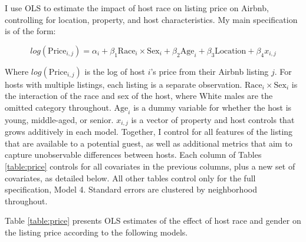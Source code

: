 
I use OLS to estimate the impact of host race on listing price on Airbnb, controlling for location, property, and host characteristics. My main specification is of the form:

\[ log(\text{Price}_{i,j}) = \alpha_i + \beta_1 \text{Race}_{i} \times \text{Sex}_i + \beta_2 \text{Age}_i + \beta_3 \text{Location} +  \beta_4 x_{i,j} \]

Where $log(\text{Price}_{i,j})$ is the log of host $i$'s price from their Airbnb listing $j$. For hosts with multiple listings, each listing is a separate observation. $\text{Race}_{i}  \times \text{Sex}_i$ is the interaction of the race and sex of the host, where White males are the omitted category throughout. $\text{Age}_i$ is a dummy variable for whether the host is young, middle-aged, or senior. $x_{i,j}$ is a vector of property and host controls that grows additively in each model. Together, I control for all features of the listing that are available to a potential guest, as well as additional metrics that aim to capture unobservable differences between hosts. Each column of Tables \ref{table:price} controls for all covariates in the previous columns, plus a new set of covariates, as detailed below. All other tables control only for the full specification, Model 4. Standard errors are clustered by neighborhood throughout.

Table \ref{table:price} presents OLS estimates of the effect of host race and gender on the listing price according to the following models. 

